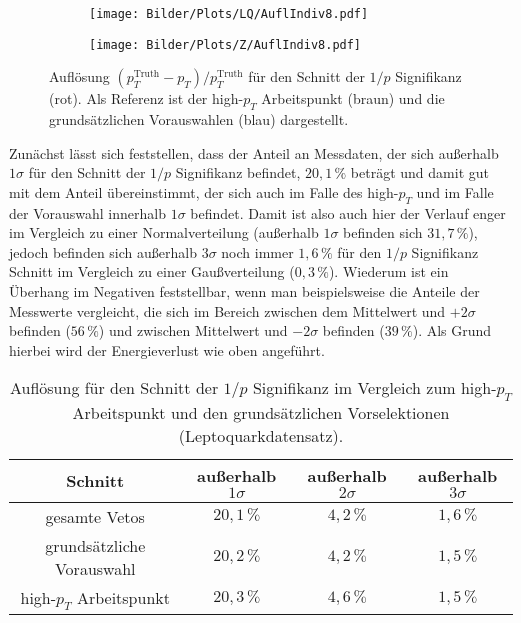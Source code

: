 \begin{figure}
  \begin{subfigure}[t]{0.55\textwidth}
  \texttt{[image: Bilder/Plots/LQ/AuflIndiv8.pdf]}
  \label{AuflIndiv8LQ}
  \end{subfigure}
\begin{subfigure}[t]{0.55\textwidth}
 \texttt{[image: Bilder/Plots/Z/AuflIndiv8.pdf]}
  \label{AuflIndiv8Z}
\end{subfigure}
\caption{Auflösung $(p_T^{\text{Truth}}-p_T)/p_T^{\text{Truth}}$ für den Schnitt der $1/p$ Signifikanz (rot). Als Referenz ist der high-$p_T$ Arbeitspunkt (braun) und die grundsätzlichen Vorauswahlen (blau) dargestellt.}
\label{AuflIndiv8}
\end{figure}  
Zunächst lässt sich feststellen, dass der Anteil an Messdaten, der sich außerhalb $1\sigma$ für den Schnitt der $1/p$ Signifikanz befindet, $20,1\,\%$ beträgt und damit gut mit dem Anteil übereinstimmt, der sich auch im Falle des high-$p_T$ und im Falle der Vorauswahl innerhalb $1\sigma$  befindet. Damit ist also auch hier der Verlauf enger im Vergleich zu einer Normalverteilung (außerhalb $1\sigma$ befinden sich $31,7\,\%$), jedoch befinden sich außerhalb $3\sigma$ noch immer $1,6\,\%$ für den $1/p$ Signifikanz Schnitt im Vergleich zu einer Gaußverteilung ($0,3\,\%$). Wiederum ist ein Überhang im Negati\-ven feststellbar, wenn man beispielsweise die Anteile der Messwerte vergleicht, die sich im Bereich zwischen dem Mittelwert und $+2\sigma$ befinden ($56\,\%$) und zwischen Mittelwert und $-2\sigma$ befinden ($39\,\%$). Als Grund hierbei wird der Energieverlust wie oben angeführt.\\
\begin{table}[htbp]
		\centering
		\begin{tabular*}{\linewidth}{@{\extracolsep{\fill}}cccc}
		\hline
		\hline
		\rule[-7pt]{0pt}{23pt} Schnitt & außerhalb $1\sigma$ & außerhalb $2\sigma$ & außerhalb $3\sigma$
		\\
		\hline
		\rule[-6pt]{0pt}{21pt} gesamte Vetos               & \(20,1\,\%\) & $4,2\,\%$ & $1,6\,\%$
		\\
		\rule[-6pt]{0pt}{21pt} grundsätzliche Vorauswahl   &  \(20,2\,\%\)	& $4,2\,\%$ & $1,5\,\%$
		\\
		\rule[-6pt]{0pt}{21pt} high-$p_T$ Arbeitspunkt     &  \(20,3\,\%\)	& $4,6\,\%$ & $1,5\,\%$
		\\
		\hline
		\hline
		\end{tabular*}
		\caption[Auflösung für den Schnitt der $1/p$ Signifikanz für den Leptoquarkdatensatz]{Auflösung für den Schnitt der $1/p$ Signifikanz im Vergleich zum high-$p_T$ Arbeitspunkt und den grundsätzlichen Vorselektionen (Leptoquarkdatensatz).}
		\label{123sigmaIndiv8LQ}
	\end{table}
